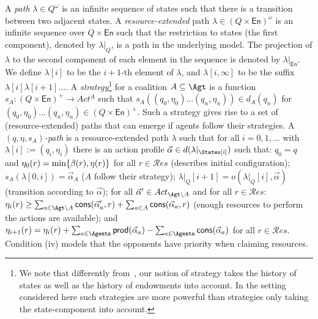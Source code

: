 \documentclass{llncs}
\newcommand{\Act}{Act}
\newcommand{\Resources}{\resourcedomain}
\newcommand{\resourcedomain}{\ensuremath{{\mathcal{R}\!\mathit{es}}}}
\newcommand{\enment}{\ensuremath{\eta}\xspace}
\newcommand{\production}{\mathsf{prod}}
\newcommand{\consumption}{\mathsf{cons}}
\newcommand{\Enments}{\ensuremath{\mathsf{En}}}
\begin{document}
\vspace{-2ex}
A \emph{path}  $\lambda \in Q^\omega$ is an infinite sequence
of states such that there is a transition between two adjacent states. A
\emph{resource-extended} path $\lambda \in (Q\times\Enments)^\omega$ is an infinite sequence over
$Q\times\Enments$ such that the restriction to states (the first component),
denoted by $\lambda|_Q$, is a path in the underlying model.  The projection of
$\lambda$ to the second component of each element in the sequence is denoted by
$\lambda|_\Enments$. 
We define $\lambda[i]$ to be the $i+1$-th element of $\lambda$, and
$\lambda[i,\infty]$ to be the suffix $\lambda[i]\lambda[i+1]\ldots$. A \emph{strategy}\footnote{{We note that differently from~\cite{Bulling/Farwer:10a,Alechina//:14c,Bulling15ral-IJCAI}, our notion of strategy takes the history of states as well as the history of endowments into account. In the setting considered here such strategies are more powerful than strategies only taking the state-component into account.}} for a coalition $A \subseteq \Agt$ is a function 
$s_A : (Q\times\Enments)^+ \to \Act^A$ such that $s_A((q_0,\enment_0)\ldots(q_n,\enment_n)) \in d_A(q_n)$ for $(q_0,\enment_0)\ldots(q_n,\enment_n)\in (Q\times\Enments)^+$. Such a strategy gives rise to a set of (resource-extended) paths that can emerge if agents  follow their  strategies. A \emph{$(q,\eta,s_A)$-path} is a resource-extended path $\lambda$ such that for all $i=0,1,\ldots$
with $\lambda[i]:=(q_i,\eta_i)$ there is an action profile
$\vec{\alpha} \in d(\lambda|_\States[i])$ such that:
\full{\begin{enumerate}}
\full{\item }$q_0=q$ and  $\eta_0(r)\short{=\enment(r)}\full{ = \min\{\beta(r),\enment(r)\}}$ for all $r\in\Resources$ (describes  initial configuration); 
\full{\item } $s_A(\lambda[0,i])=  \vec{\alpha}_A$ 
 ($A$ follow their strategy); 
\full{\item } $\lambda|_Q[i+1]=o(\lambda|_Q[i],\vec{\alpha})$ 
 (transition according to $\vec{\alpha}$); 
\full{\item } for all $\vec{\alpha}'\in \Act_{\Agt\backslash A}$ and for all $r\in\Resources$: $\eta_{i}(r) \geq \sum_{a \in \Agt\backslash A}\consumption(\vec{\alpha}'_a,r)+\sum_{a \in A}\consumption(\vec{\alpha}_a,r)$ 
 (enough resources to perform the actions are available); and
 \full{\item}   $\eta_{i+1}(r)=\eta_i(r)+\sum_{a\in\Agents}\production(\vec{\alpha}_a) -\sum_{a\in\Agents}\consumption(\vec{\alpha}_a)$ for all $r\in\Resources$.
\full{\end{enumerate}} Condition (iv) models that the opponents have priority when claiming resources.
\end{document}
